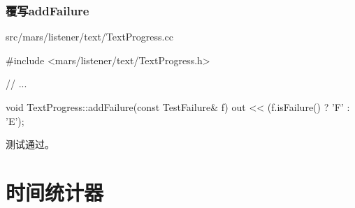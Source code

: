 \begin{content}
\subsubsection{覆写addFailure}

\begin{nodiff}{src/mars/listener/text/TextProgress.cc}
 \begin{c++}
#include <mars/listener/text/TextProgress.h>

// ...

void TextProgress::addFailure(const TestFailure& f) {
  out << (f.isFailure() ? 'F' : 'E');
}
 \end{c++}
\end{nodiff}

测试通过。

\end{content}

\section{时间统计器}


